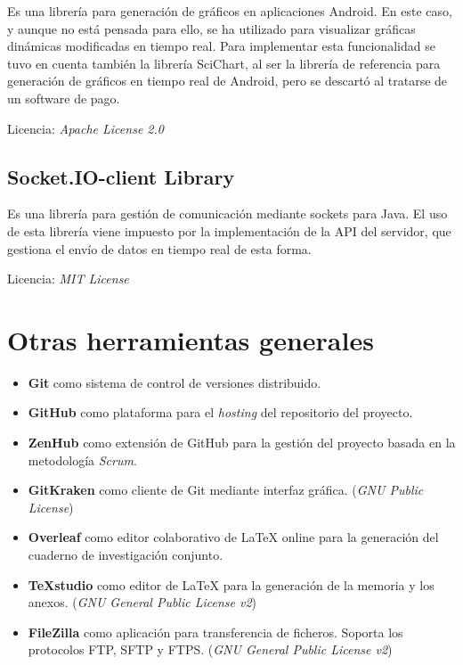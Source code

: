 Es una librería para generación de gráficos en aplicaciones Android. En este caso, y aunque no está pensada para ello, se ha utilizado para visualizar gráficas dinámicas modificadas en tiempo real. Para implementar esta funcionalidad se tuvo en cuenta también la librería SciChart, al ser la librería de referencia para generación de gráficos en tiempo real de Android, pero se descartó al tratarse de un software de pago. 

Licencia: \textit{Apache License 2.0}

\subsection{Socket.IO-client Library}

Es una librería para gestión de comunicación mediante sockets para Java. El uso de esta librería viene impuesto por la implementación de la API del servidor, que gestiona el envío de datos en tiempo real de esta forma. 

Licencia: \textit{MIT License}

\section{Otras herramientas generales}

\begin{itemize}
	\item \textbf{Git} como sistema de control de versiones distribuido. 
	\item \textbf{GitHub} como plataforma para el \textit{hosting} del repositorio del proyecto. 
	\item \textbf{ZenHub} como extensión de GitHub para la gestión del proyecto basada en la metodología \textit{Scrum}. 
	\item \textbf{GitKraken} como cliente de Git mediante interfaz gráfica. (\textit{GNU Public License})
	\item \textbf{Overleaf} como editor colaborativo de LaTeX online para la generación del cuaderno de investigación conjunto. 
	\item \textbf{TeXstudio} como editor de LaTeX para la generación de la memoria y los anexos. (\textit{GNU General Public License v2})
	\item \textbf{FileZilla} como aplicación para transferencia de ficheros. Soporta los protocolos FTP, SFTP y FTPS. (\textit{GNU General Public License v2}) 
\end{itemize}




















